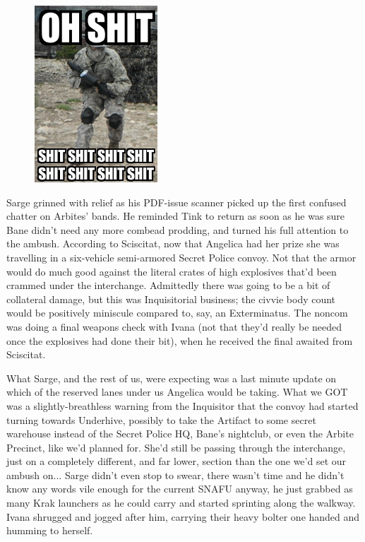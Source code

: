 

\begin{figure}
	\begin{center}
		\includegraphics[width=\figwidth]{pics/19/38.png}
	\end{center}
\end{figure}
Sarge grinned with relief as his PDF-issue scanner picked up the first confused chatter on Arbites' bands. 
He reminded Tink to return as soon as he was sure Bane didn't need any more combead prodding, and turned his full attention to the ambush. 
According to Sciscitat, now that Angelica had her prize she was travelling in a six-vehicle semi-armored Secret Police convoy. 
Not that the armor would do much good against the literal crates of high explosives that'd been crammed under the interchange. 
Admittedly there was going to be a bit of collateral damage, but this was Inquisitorial business; 
the civvie body count would be positively miniscule compared to, say, an Exterminatus. 
The noncom was doing a final weapons check with Ivana (not that they'd really be needed once the explosives had done their bit), when he received the final awaited from Sciscitat.

What Sarge, and the rest of us, were expecting was a last minute update on which of the reserved lanes under us Angelica would be taking. 
What we GOT was a slightly-breathless warning from the Inquisitor that the convoy had started turning towards Underhive, possibly to take the Artifact to some secret warehouse instead of the Secret Police HQ, Bane's nightclub, or even the Arbite Precinct, like we'd planned for. 
She'd still be passing through the interchange, just on a completely different, and far lower, section than the one we'd set our ambush on... 
Sarge didn't even stop to swear, there wasn't time and he didn't know any words vile enough for the current SNAFU anyway, he just grabbed as many Krak launchers as he could carry and started sprinting along the walkway. 
Ivana shrugged and jogged after him, carrying their heavy bolter one handed and humming to herself.

